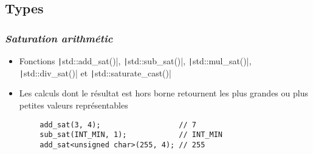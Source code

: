 \documentclass[C++.tex]{subfiles}
\begin{document}
\subsection*{Types}
\begin{frame}[fragile]
	\frametitle{\textit{Saturation arithmétic}}
	\begin{itemize}
		\item Fonctions \texttt|std::add_sat()|, \texttt|std::sub_sat()|, \texttt|std::mul_sat()|, \texttt|std::div_sat()| et \texttt|std::saturate_cast()|
		\item Les calculs dont le résultat est hors borne retournent les plus grandes ou plus petites valeurs représentables
	\end{itemize}

	\begin{verbatim}
		add_sat(3, 4);                  // 7
		sub_sat(INT_MIN, 1);            // INT_MIN
		add_sat<unsigned char>(255, 4); // 255
	\end{verbatim}


\end{frame}
\end{document}
